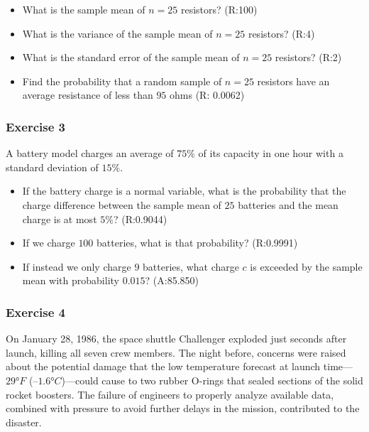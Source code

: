 \documentclass[
]{book}
\begin{document}
\begin{itemize}
\item
  What is the sample mean of \(n=25\) resistors? (R:100)
\item
  What is the variance of the sample mean of \(n=25\) resistors? (R:4)
\item
  What is the standard error of the sample mean of \(n=25\) resistors? (R:2)
\item
  Find the probability
  that a random sample of \(n = 25\) resistors have an average resistance of less than \(95\) ohms (R: 0.0062)
\end{itemize}

\hypertarget{exercise-3-5}{%
\subsubsection{Exercise 3}\label{exercise-3-5}}

A battery model charges an average of \(75\%\) of its capacity in one hour with a standard deviation of \(15\%\).

\begin{itemize}
\item
  If the battery charge is a normal variable, what is the probability that the charge difference between the sample mean of \(25\) batteries and the mean charge is at most \(5\%\)? (R:0.9044)
\item
  If we charge \(100\) batteries, what is that probability? (R:0.9991)
\item
  If instead we only charge \(9\) batteries, what charge \(c\) is exceeded by the sample mean with probability \(0.015\)? (A:85.850)
\end{itemize}

\hypertarget{exercise-4-4}{%
\subsubsection{Exercise 4}\label{exercise-4-4}}

On January 28, 1986, the space shuttle Challenger exploded just seconds after launch, killing all seven crew members. The night before, concerns were raised about the potential damage that the low temperature forecast at launch time---\(29°F\) (\(–1.6°C\))---could cause to two rubber O-rings that sealed sections of the solid rocket boosters. The failure of engineers to properly analyze available data, combined with pressure to avoid further delays in the mission, contributed to the disaster.
\end{document}
